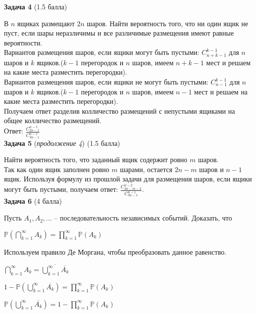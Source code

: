 \documentclass{article}
\newcommand\myp{\mathbb P}
\begin{document}
\textbf{Задача 4} (1.5 балла)

В $n$ ящиках размещают $2n$ шаров. Найти вероятность того, что ни один ящик не пуст, если шары неразличимы и все различимые размещения имеют равные вероятности.\\

Вариантов размещения шаров, если ящики  могут быть пустыми: $ C_{n+k-1}^{k-1}$ для $n$ шаров и $k$ ящиков.($k-1$ перегородок и $n$ шаров, имеем $n+k-1$ мест и решаем на какие места разместить перегородки).\\
Вариантов размещения шаров, если ящики не могут быть пустыми: $ C_{n-1}^{k-1}$ для $n$ шаров и $k$ ящиков.($k-1$ перегородок и $n$ шаров, имеем $n-1$ мест и решаем на какие места разместить перегородки).\\
Получаем ответ разделив колличество размещений с непустыми ящиками на общее колличество размещений.\\
Ответ: $\frac{C_{2n-1}^{n-1}}{C_{3n-1}^{n-1}}$\\

\textbf{Задача 5} (\textit{продолжение 4}) (1.5 балла)

Найти вероятность того, что заданный ящик содержит ровно $m$ шаров.\\

Так как один ящик заполнен ровно $m$ шарами, остается $2n-m$ шаров и $n-1$ ящик. Используя формулу из прошлой задачи для размещения шаров, если ящики  могут быть пустыми, получаем ответ: $\frac{C_{3n-m-2}^{n-2}}{C_{3n-1}^{n-1}}$.\\

\textbf{Задача 6} (4 балла)

Пусть $A_1, A_2, \dots$ -- последовательность независимых событий. Доказать, что

\begin{center}
    $\myp(\bigcap\limits_{k=1}^{\infty} A_k) = \prod\limits_{k=1}^{\infty}\myp(A_k)$ 
\end{center}




Используем правило Де Моргана, чтобы преобразовать данное равенство.
\begin{center}
	$\bigcap\limits_{k=1}^{\infty} A_k = \overline{\bigcup\limits_{k=1}^{\infty} \overline{A_k}}$
	
	$1 - \myp(\bigcup\limits_{k=1}^{\infty} \overline{A_k}) = \prod\limits_{k=1}^{\infty}\myp(A_k)$
	
	$\myp(\bigcup\limits_{k=1}^{\infty} \overline{A_k}) = 1 - \prod\limits_{k=1}^{\infty}\myp(A_k)$
\end{center}
\end{document}

